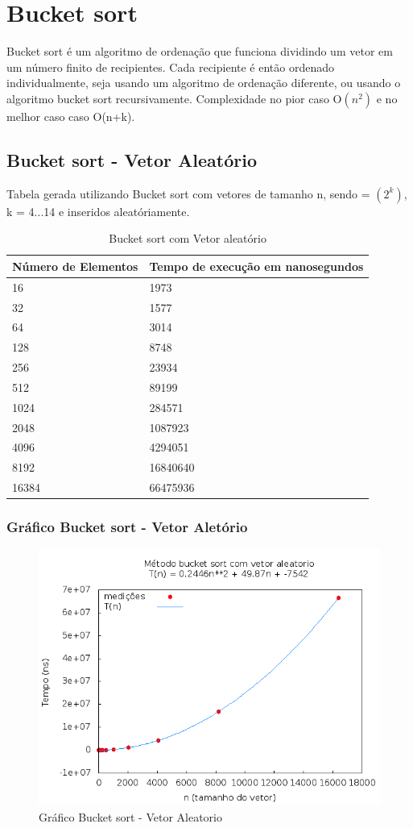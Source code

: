 \documentclass[12pt,a4paper,twoside]{report}
\begin{document}
\chapter{Bucket sort}
Bucket sort é um algoritmo de ordenação que funciona dividindo um vetor em um número finito de recipientes. Cada recipiente é então ordenado individualmente, seja usando um algoritmo de ordenação diferente, ou usando o algoritmo bucket sort recursivamente. Complexidade no pior caso O$(n^2)$ e no melhor caso caso O(n+k).
\section{Bucket sort - Vetor Aleatório}
Tabela gerada utilizando Bucket sort com vetores de tamanho n, sendo = $(2^k)$, k = 4...14 e inseridos aleatóriamente.
\begin{table}[H]
\centering
\caption{Bucket sort com Vetor aleatório}
\begin{tabular}{|l|l|}
\hline
\multicolumn{1}{|c|}{\textbf{Número de Elementos}} & \multicolumn{1}{c|}{\textbf{Tempo de execução em nanosegundos}} \\ \hline
16 & 1973 \\ \hline
32 & 1577 \\ \hline
64 & 3014 \\ \hline
128 & 8748 \\ \hline
256 & 23934 \\ \hline
512 & 89199 \\ \hline
1024 & 284571 \\ \hline
2048 & 1087923 \\ \hline
4096 & 4294051 \\ \hline
8192 & 16840640 \\ \hline
16384 & 66475936 \\ \hline
\end{tabular}
\end{table}


\subsection{Gráfico Bucket sort - Vetor Aletório}
\begin{figure}[H]
    \centering
    \includegraphics[width=0.7\linewidth]{graficos/Bucket/vIntAleatorio/vIntAleatorio.png}
  \caption{Gráfico Bucket sort - Vetor Aleatorio}
\end{figure}
\end{document}

